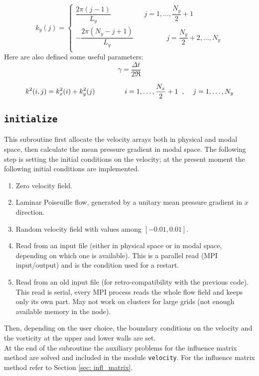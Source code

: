 \[
k_y(j)=
\begin{cases}
\dfrac{2\pi(j-1)}{L_y} \hspace{2cm} j=1,\dots,\dfrac{N_y}{2}+1\\[3ex]
-\dfrac{2\pi(N_y-j+1)}{L_y} \hspace{2cm} j=\dfrac{N_y}{2}+2,\dots,N_y\\
\end{cases}
\]
Here are also defined some useful parameters:
\[
\gamma=\frac{\Delta t}{2\Re}
\]

\[
k^2(i,j)=k_x^2(i)+k_y^2(j) \hspace{1.5cm} i=1,\dots,\frac{N_x}{2}+1 \hspace{0.2cm},\hspace{0.4cm}  j=1,\dots,N_y
\]

\subsection{\texttt{initialize}}
This subroutine first allocate the velocity arrays both in physical and modal space, then calculate the mean pressure gradient in modal space. The following step is setting the initial conditions on the velocity; at the present moment the following initial conditions are implemented.
\begin{enumerate}
\item Zero velocity field.
\item Laminar Poiseuille flow, generated by a unitary mean pressure gradient in $x$ direction.
\item Random velocity field with values among $[-0.01,0.01]$.
\item Read from an input file (either in physical space or in modal space, depending on which one is available). This is a parallel read (MPI input/output) and is the condition used for a restart.
\item Read from an old input file (for retro-compatibility with the previous code).  This read is serial, every MPI process reads the whole flow field and keeps only its own part. May not work on clusters for large grids (not enough available memory in the node).
\end{enumerate}
Then, depending on the user choice, the boundary conditions on the velocity and the vorticity at the upper and lower walls are set.\\
At the end of the subroutine the auxiliary problems for the influence matrix method are solved and included in the module \texttt{velocity}. For the influence matrix method refer to Section \ref{sec: infl_matrix}.

